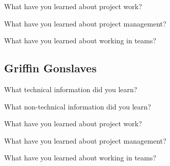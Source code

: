 \documentclass[letterpaper, 10pt, draftclsnofoot, compsoc, onecolumn]{IEEEtran}
\begin{document}
What have you learned about project work?

What have you learned about project management?

What have you learned about working in teams?

\subsection{Griffin Gonslaves}
What technical information did you learn?

What non-technical information did you learn?

What have you learned about project work?

What have you learned about project management?

What have you learned about working in teams?
\end{document}
